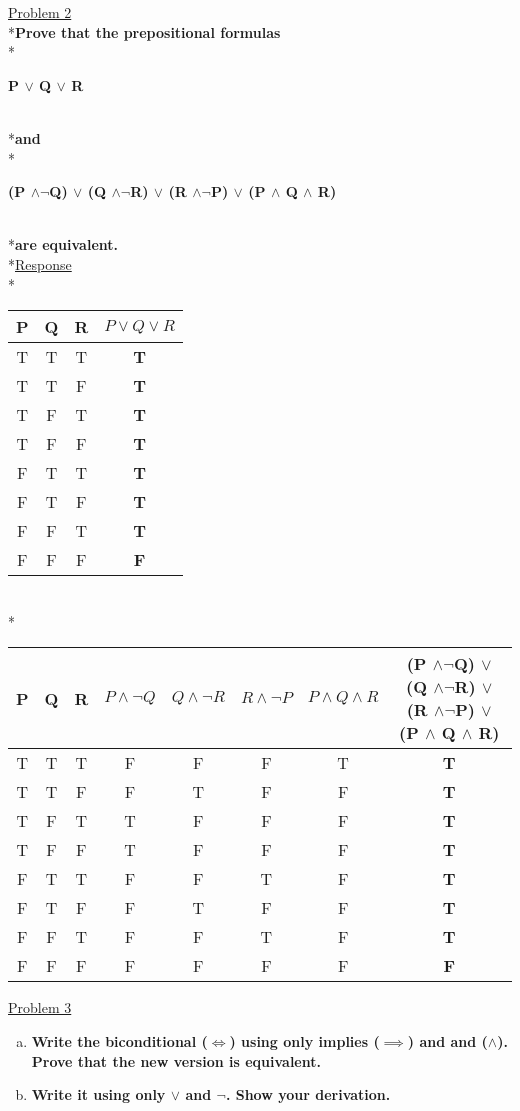 \documentclass[12pt]{article}
\begin{document}
\noindent
\uline{Problem 2}
\\*\textbf{Prove that the prepositional formulas}
\smallskip
\\*\centerline{\textbf{P $\lor$ Q $\lor$ R}}
\smallskip
\\*\textbf{and}
\smallskip
\\*\centerline{\textbf{(P $\land \neg$Q) $\lor$ (Q $\land \neg$R) $\lor$ (R $\land \neg$P) $\lor$ (P $\land$ Q $\land$ R)}}
\smallskip
\\*\textbf{are equivalent.}
\bigskip
\\*\uline{Response}
\bigskip
\\*
\begin{tabular}{c|c|c|c}
P & Q & R & $P \lor Q \lor R$\\
\hline
T & T & T & \textbf{T} \\
T & T & F & \textbf{T}\\
T & F & T & \textbf{T}\\
T & F & F & \textbf{T}\\
F & T & T & \textbf{T}\\
F & T & F & \textbf{T}\\
F & F & T & \textbf{T}\\
F & F & F & \textbf{F}\\
\end{tabular}
\qquad\qquad
\vspace{.5cm}
\\*\begin{tabular}{c|c|c|c|c|c|c|c}
P & Q & R & $P \land \neg Q$ & $Q \land \neg R$ & $R \land \neg P$ & $P \land Q \land R$ & (P $\land \neg$Q) $\lor$ (Q $\land \neg$R) $\lor$ (R $\land \neg$P) $\lor$ (P $\land$ Q $\land$ R)\\
\hline
T & T & T & F & F & F & T & \textbf{T}\\
T & T & F & F & T & F & F & \textbf{T}\\
T & F & T & T & F & F & F & \textbf{T}\\
T & F & F & T & F & F & F & \textbf{T}\\
F & T & T & F & F & T & F & \textbf{T}\\
F & T & F & F & T & F & F & \textbf{T}\\
F & F & T & F & F & T & F & \textbf{T}\\
F & F & F & F & F & F & F & \textbf{F}\\

\end{tabular}
\bigskip\bigskip
\noindent
\newpage\uline{Problem 3}
\begin{enumerate}[(a)]
\item \textbf{Write the biconditional ($\iff$) using only implies ($\implies$) and and ($\land$). Prove that the new version is equivalent.}
\item \textbf{Write it using only $\lor$ and $\neg$. Show your derivation.}
\end{enumerate}
\end{document}
